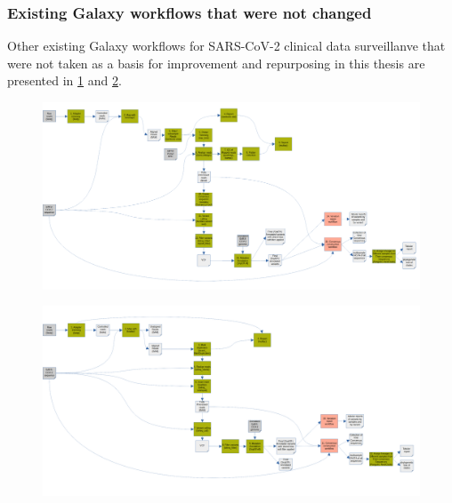         \subsubsection{Existing Galaxy workflows that were not changed} \label{sec:appendix:figures:wfs}
        Other existing Galaxy workflows for SARS-CoV-2 clinical data surveillanve that were not taken as a basis for improvement and repurposing in this thesis are presented in \cref{fig:further:ont-wf} and \cref{fig:further:illumina-wf}.
        \begin{landscape}
        \centering\vspace*{\fill}
        \begin{figure}[ht!]
        	\centering
            \includegraphics[width=1.4\textwidth]{figures/further/further-ont-wf.png}
            \label{fig:further:ont-wf}
        \end{figure}
        \begin{figure}[ht!]
        	\centering
            \includegraphics[width=1.4\textwidth]{figures/further/further-illumina-wf.png}
            \label{fig:further:illumina-wf}
        \end{figure}
        \vfill
        \end{landscape}
        
        
\clearpage

